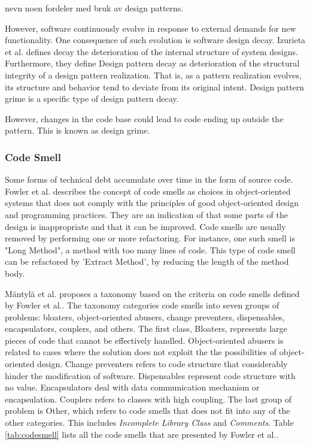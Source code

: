 nevn noen fordeler med bruk av design patterns.



However, software continuously evolve in response to external demands for new functionality. One consequence of such evolution is software design decay. Izurieta et al.\cite{izurieta2007software} defines decay the deterioration of the internal structure of system designs. Furthermore, they define Design pattern decay as deterioration of the structural integrity of a design pattern realization. That is, as a pattern realization evolves, its structure and behavior tend to deviate from its original intent. Design pattern grime is a specific type of design pattern decay\cite{izurieta2007software}. 

However, changes in the code base could lead to code ending up outside the pattern. This is known as design grime. 




\subsubsection{Code Smell}
\label{subsub:codesmell}
Some forms of technical debt accumulate over time in the form of source code\cite{zazworka2014comparing}. Fowler et al.\cite{fowler1999refactoring} describes the concept of code smells as choices in object-oriented systems that does not comply with the principles of good object-oriented design and programming practices. They are an indication of that some parts of the design is inappropriate and that it can be improved. Code smells are usually removed by performing one or more refactoring\cite{fowler1999refactoring}. For instance, one such smell is "Long Method", a method with too many lines of code. This type of code smell can be refactored by 'Extract Method', by reducing the length of the method body\cite{fowler1999refactoring}. 

Mäntylä et al.\cite{mantyla2003taxonomy} proposes a taxonomy based on the criteria on code smells defined by Fowler et al.\cite{fowler1999refactoring}. The taxonomy categories code smells into seven groups of problems: bloaters, object-oriented abusers, change preventers, dispensables, encapsulators, couplers, and others. The first class, Bloaters, represents large pieces of code that cannot be effectively handled. Object-oriented abusers is related to cases where the solution does not exploit the the possibilities of object-oriented design. Change preventers refers to code structure that considerably hinder the modification of software. Dispensables represent code structure with no value. Encapsulators deal with data communication mechanism or encapsulation. Couplers refers to classes with high coupling. The last group of problem is Other, which refers to code smells that does not fit into any of the other categories. This includes \textit{Incomplete Library Class} and \textit{Comments}. Table \ref{tab:codesmell} lists all the code smells that are presented by Fowler et al.\cite{fowler1999refactoring}.


